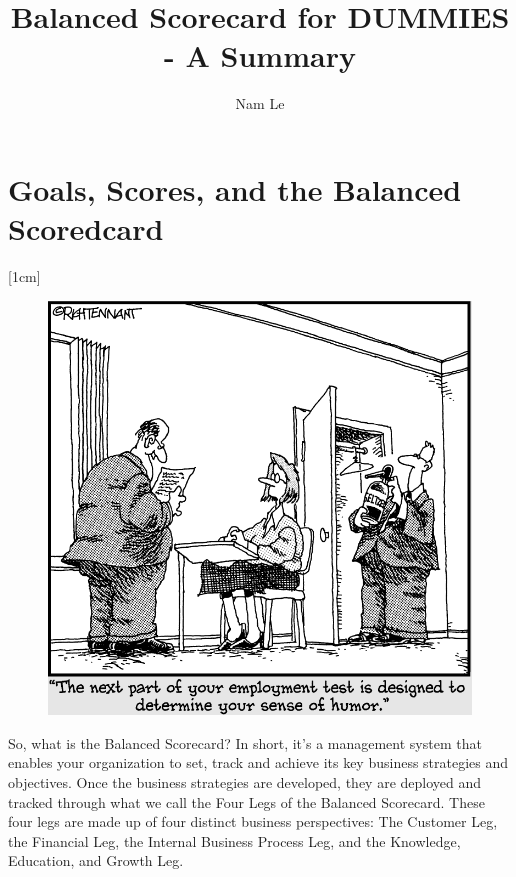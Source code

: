 \documentclass[a4paper,twoside,12pt]{article}
\author{Nam Le}
\title{%
	Balanced Scorecard for DUMMIES - A Summary}
\begin{document}
\maketitle

\pagestyle{empty}

\section{Goals, Scores, and the Balanced Scoredcard}
[1cm]

\begin{figure}[!htb]
	\centering
	\includegraphics[scale=1.5]{figures/balancedscorecard_sensofhumor} \\
	\label{balancedscorecard_sensofhumor} 
\end{figure}

So, what is the Balanced Scorecard? In short, it’s a management system that
enables your organization to set, track and achieve its key business strategies
and objectives. Once the business strategies are developed, they are
deployed and tracked through what we call the Four Legs of the Balanced
Scorecard. These four legs are made up of four distinct business perspectives:
The Customer Leg, the Financial Leg, the Internal Business Process Leg,
and the Knowledge, Education, and Growth Leg.
\end{document}
